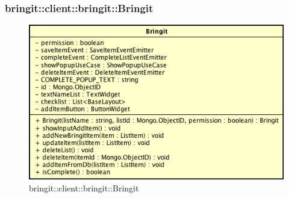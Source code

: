 \subsubsection{bringit::client::bringit::Bringit}

\label{bringit::client::bringit::Bringit}
\begin{figure}[H]
	\centering
	\includegraphics[scale=0.5]{Sezioni/SottosezioniST/img/app/Bringit.png}
	\caption{bringit::client::bringit::Bringit}
\end{figure}

